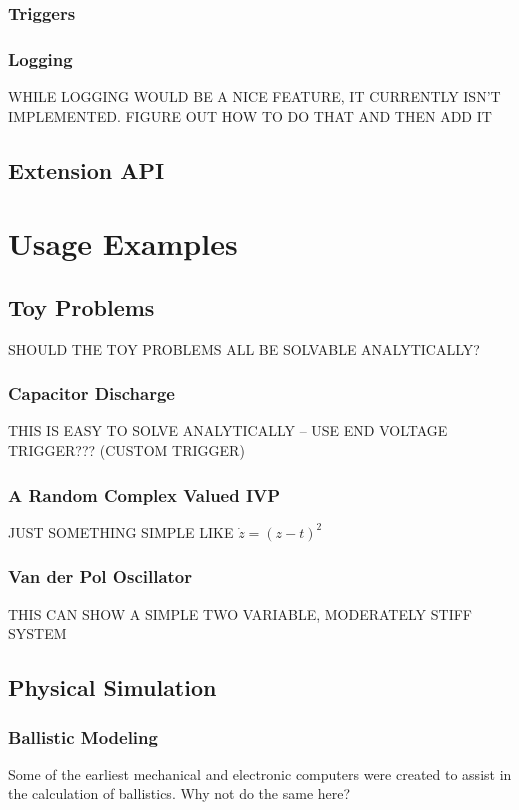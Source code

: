 \documentclass[letterpaper,10pt]{book}
\begin{document}
    \section{Triggers}
    
    \section{Logging}
    WHILE LOGGING WOULD BE A NICE FEATURE, IT CURRENTLY ISN'T IMPLEMENTED.  FIGURE OUT HOW TO DO THAT AND THEN ADD IT

  \chapter{Extension API}

  
\part{Usage Examples}

  \chapter{Toy Problems}
    SHOULD THE TOY PROBLEMS ALL BE SOLVABLE ANALYTICALLY?
    
    \section{Capacitor Discharge}
      THIS IS EASY TO SOLVE ANALYTICALLY -- USE END VOLTAGE TRIGGER??? (CUSTOM TRIGGER)

    \section{A Random Complex Valued IVP}
      JUST SOMETHING SIMPLE LIKE $\dot{z} = (z - t)^{2}$

    \section{Van der Pol Oscillator}
      THIS CAN SHOW A SIMPLE TWO VARIABLE, MODERATELY STIFF SYSTEM

  \chapter{Physical Simulation}
    \section{Ballistic Modeling}
      Some of the earliest mechanical and electronic computers were created to assist in the calculation of ballistics.  Why not do the same here?
      
\end{document}
